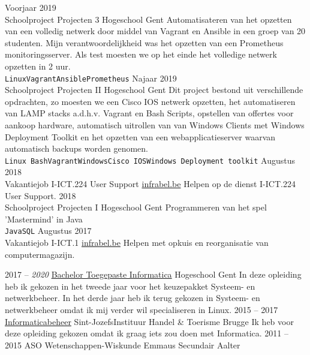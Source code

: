 \documentclass[9pt]{developercv} %
\begin{document}
\begin{entrylist}
	\entry
		{Voorjaar 2019\\\footnotesize{Schoolproject}}
		{Projecten 3}
		{Hogeschool Gent}
		{Automatisateren van het opzetten van een volledig netwerk door middel van Vagrant en Ansible in een groep van 20 studenten. Mijn verantwoordelijkheid was het opzetten van een Prometheus monitoringsserver. Als test moesten we op het einde het volledige netwerk opzetten in 2 uur.
		\\ \texttt{Linux}\slashsep\texttt{Vagrant}\slashsep\texttt{Ansible}\slashsep\texttt{Prometheus}}
	\entry
		{Najaar 2019\\\footnotesize{Schoolproject}}
		{Projecten II}
		{Hogeschool Gent}
		{Dit project bestond uit verschillende opdrachten, zo moesten we een Cisco IOS netwerk opzetten, het automatiseren van LAMP stacks a.d.h.v. Vagrant en Bash Scripts, opstellen van offertes voor aankoop hardware, automatisch uitrollen van van Windows Clients met Windows Deployment Toolkit en het opzetten van een webapplicatieserver waarvan automatisch backups worden genomen.
		\\ \texttt{Linux Bash}\slashsep\texttt{Vagrant}\slashsep\texttt{Windows}\slashsep\texttt{Cisco IOS}\slashsep\texttt{Windows Deployment toolkit}}
	\entry
	    {Augustus 2018\\\footnotesize{Vakantiejob}}
	    {I-ICT.224 User Support}
	    {\href{https://www.infrabel.be/}{infrabel.be}}
	    {Helpen op de dienst I-ICT.224 User Support.}
	\entry
		{2018\\\footnotesize{Schoolproject}}
		{Projecten I}
		{Hogeschool Gent}
		{Programmeren van het spel 'Mastermind' in Java\\
		\texttt{Java}\slashsep\texttt{SQL}}
	\entry
	    {Augustus 2017\\\footnotesize{Vakantiejob}}
	    {I-ICT.1}
	    {\href{https://www.infrabel.be/}{infrabel.be}}
	    {Helpen met opkuis en reorganisatie van computermagazijn.}
\end{entrylist}



\begin{entrylist}
	\entry
		{2017 -- \textit{2020}}
		{\href{https://www.hogent.be/opleidingen/bachelors/toegepaste-informatica/}{Bachelor Toegepaste Informatica}}
		{Hogeschool Gent}
		{In deze opleiding heb ik gekozen in het tweede jaar voor het keuzepakket Systeem- en netwerkbeheer. In het derde jaar heb ik terug gekozen in Systeem- en netwerkbeheer omdat ik mij verder wil specialiseren in Linux. }
	\entry
		{2015 -- 2017}
		{\href{https://www.sintjozefbrugge.be/5e-en-6e-netwerken-en-it/}{Informaticabeheer}}
		{Sint-JozefsInstituur Handel \& Toerisme Brugge}
		{Ik heb voor deze opleiding gekozen omdat ik graag iets zou doen met Informatica.}
	\entry
		{2011 -- 2015}
		{ASO Wetenschappen-Wiskunde}
		{Emmaus Secundair Aalter}
		{ }
\end{entrylist}
\end{document}
